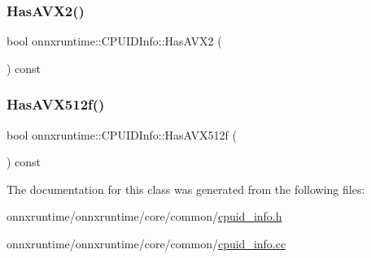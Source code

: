 \mbox{\label{classonnxruntime_1_1CPUIDInfo_a10143714e81d446422ebeea2cb9b8a0e}} 
\subsubsection{\texorpdfstring{Has\+A\+V\+X2()}{HasAVX2()}}
{\footnotesize\ttfamily bool onnxruntime\+::\+C\+P\+U\+I\+D\+Info\+::\+Has\+A\+V\+X2 (\begin{DoxyParamCaption}{ }\end{DoxyParamCaption}) const\hspace{0.3cm}{\ttfamily [inline]}}

\mbox{\label{classonnxruntime_1_1CPUIDInfo_a3ef37390c7764244faa869260d21379a}} 
\subsubsection{\texorpdfstring{Has\+A\+V\+X512f()}{HasAVX512f()}}
{\footnotesize\ttfamily bool onnxruntime\+::\+C\+P\+U\+I\+D\+Info\+::\+Has\+A\+V\+X512f (\begin{DoxyParamCaption}{ }\end{DoxyParamCaption}) const\hspace{0.3cm}{\ttfamily [inline]}}



The documentation for this class was generated from the following files\+:\begin{DoxyCompactItemize}
\item 
onnxruntime/onnxruntime/core/common/\mbox{\hyperlink{cpuid__info_8h}{cpuid\+\_\+info.\+h}}\item 
onnxruntime/onnxruntime/core/common/\mbox{\hyperlink{cpuid__info_8cc}{cpuid\+\_\+info.\+cc}}\end{DoxyCompactItemize}
